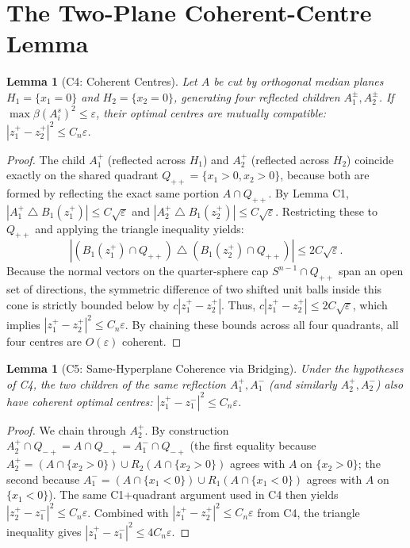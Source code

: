 \documentclass[11pt]{article}
\newtheorem{lemma}[theorem]{Lemma}
\newcommand{\eps}{\varepsilon}
\begin{document}
\section{The Two-Plane Coherent-Centre Lemma}

\begin{lemma}[C4: Coherent Centres] \label{lem:C4}
Let $A$ be cut by orthogonal median planes $H_1=\{x_1=0\}$ and $H_2=\{x_2=0\}$, generating four reflected children $A_1^\pm, A_2^\pm$. If $\max \beta(A_i^s)^2 \le \eps$, their optimal centres are mutually compatible: $|z_1^+ - z_2^+|^2 \le C_n \eps$.
\end{lemma}
\begin{proof}
The child $A_1^+$ (reflected across $H_1$) and $A_2^+$ (reflected across $H_2$) coincide exactly on the shared quadrant $Q_{++} = \{x_1>0, x_2>0\}$, because both are formed by reflecting the exact same portion $A \cap Q_{++}$. 
By Lemma C1, $|A_1^+ \mathbin{\triangle} B_1(z_1^+)| \le C \sqrt{\eps}$ and $|A_2^+ \mathbin{\triangle} B_1(z_2^+)| \le C \sqrt{\eps}$. Restricting these to $Q_{++}$ and applying the triangle inequality yields:
\[
  |(B_1(z_1^+) \cap Q_{++}) \mathbin{\triangle} (B_1(z_2^+) \cap Q_{++})| \le 2C \sqrt{\eps}.
\]
Because the normal vectors on the quarter-sphere cap $S^{n-1} \cap Q_{++}$ span an open set of directions, the symmetric difference of two shifted unit balls inside this cone is strictly bounded below by $c|z_1^+ - z_2^+|$. Thus, $c|z_1^+ - z_2^+| \le 2C\sqrt{\eps}$, which implies $|z_1^+ - z_2^+|^2 \le C_n \eps$. By chaining these bounds across all four quadrants, all four centres are $O(\eps)$ coherent.
\end{proof}

\begin{lemma}[C5: Same-Hyperplane Coherence via Bridging] \label{lem:C5}
Under the hypotheses of C4, the two children of the \emph{same} reflection $A_1^+, A_1^-$ (and similarly $A_2^+, A_2^-$) also have coherent optimal centres: $|z_1^+ - z_1^-|^2 \le C_n \eps$.
\end{lemma}
\begin{proof}
We chain through $A_2^+$. By construction $A_2^+ \cap Q_{-+} = A \cap Q_{-+} = A_1^- \cap Q_{-+}$ (the first equality because $A_2^+ = (A \cap \{x_2>0\}) \cup R_2(A \cap \{x_2>0\})$ agrees with $A$ on $\{x_2>0\}$; the second because $A_1^- = (A \cap \{x_1<0\}) \cup R_1(A \cap \{x_1<0\})$ agrees with $A$ on $\{x_1<0\}$). The same C1+quadrant argument used in C4 then yields $|z_2^+ - z_1^-|^2 \le C_n \eps$. Combined with $|z_1^+ - z_2^+|^2 \le C_n \eps$ from C4, the triangle inequality gives $|z_1^+ - z_1^-|^2 \le 4 C_n \eps$.
\end{proof}
\end{document}
